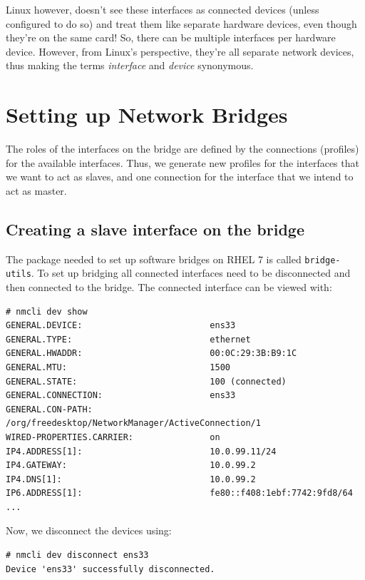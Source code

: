 Linux however, doesn't see these interfaces as connected devices (unless configured to do so) and treat them like separate hardware devices, even though they're on the same card! So, there can be multiple interfaces per hardware device. However, from Linux's perspective, they're all separate network devices, thus making the terms \textit{interface} and \textit{device} synonymous. 

\section{Setting up Network Bridges}
The roles of the interfaces on the bridge are defined by the connections (profiles) for the available interfaces. Thus, we generate new profiles for the interfaces that we want to act as slaves, and one connection for the interface that we intend to act as master.

\subsection{Creating a slave interface on the bridge}
The package needed to set up software bridges on RHEL 7 is called \verb|bridge-utils|. To set up bridging all connected interfaces need to be disconnected and then connected to the bridge. The connected interface can be viewed with:

\vspace{-15pt}
\begin{verbatim}
# nmcli dev show
GENERAL.DEVICE:                         ens33
GENERAL.TYPE:                           ethernet
GENERAL.HWADDR:                         00:0C:29:3B:B9:1C
GENERAL.MTU:                            1500
GENERAL.STATE:                          100 (connected)
GENERAL.CONNECTION:                     ens33
GENERAL.CON-PATH:                       /org/freedesktop/NetworkManager/ActiveConnection/1
WIRED-PROPERTIES.CARRIER:               on
IP4.ADDRESS[1]:                         10.0.99.11/24
IP4.GATEWAY:                            10.0.99.2
IP4.DNS[1]:                             10.0.99.2
IP6.ADDRESS[1]:                         fe80::f408:1ebf:7742:9fd8/64
...
\end{verbatim}
\vspace{-10pt}	

\noindent
Now, we disconnect the devices using:

\vspace{-15pt}
\begin{verbatim}
# nmcli dev disconnect ens33
Device 'ens33' successfully disconnected.
\end{verbatim}
\vspace{-10pt}	

